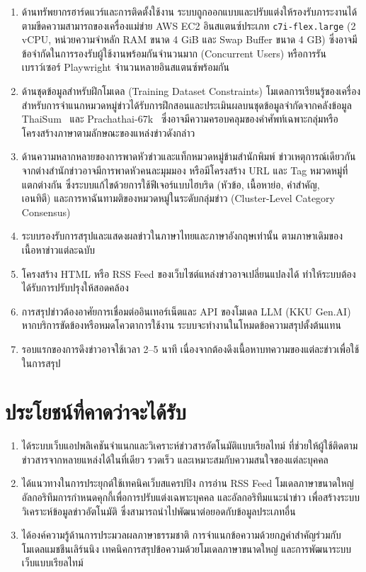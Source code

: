 \begin{enumerate}
    \item ด้านทรัพยากรฮาร์ดแวร์และการติดตั้งใช้งาน ระบบถูกออกแบบและปรับแต่งให้รองรับภาระงานได้ตามขีดความสามารถของเครื่องแม่ข่าย AWS EC2 อินสแตนซ์ประเภท \texttt{c7i-flex.large} (2 vCPU, หน่วยความจำหลัก RAM ขนาด 4 GiB และ Swap Buffer ขนาด 4 GB) ซึ่งอาจมีข้อจำกัดในการรองรับผู้ใช้งานพร้อมกันจำนวนมาก (Concurrent Users) หรือการรันเบราว์เซอร์ Playwright จำนวนหลายอินสแตนซ์พร้อมกัน
    \item ด้านชุดข้อมูลสำหรับฝึกโมเดล (Training Dataset Constraints) โมเดลการเรียนรู้ของเครื่องสำหรับการจำแนกหมวดหมู่ข่าวได้รับการฝึกสอนและประเมินผลบนชุดข้อมูลจำกัดจากคลังข้อมูล ThaiSum~\parencite{chumpolsathien2020thaisum} และ Prachathai-67k~\parencite{prachathai67k} ซึ่งอาจมีความครอบคลุมของคำศัพท์เฉพาะกลุ่มหรือโครงสร้างภาษาตามลักษณะของแหล่งข่าวดังกล่าว
    \item ด้านความหลากหลายของการพาดหัวข่าวและแท็กหมวดหมู่ข้ามสำนักพิมพ์ ข่าวเหตุการณ์เดียวกันจากต่างสำนักข่าวอาจมีการพาดหัวคนละมุมมอง หรือมีโครงสร้าง URL และ Tag หมวดหมู่ที่แตกต่างกัน ซึ่งระบบแก้ไขด้วยการใช้ฟีเจอร์แบบไฮบริด (หัวข้อ, เนื้อหาย่อ, คำสำคัญ, \\เอนทิตี) และการหาฉันทามติของหมวดหมู่ในระดับกลุ่มข่าว (Cluster-Level Category Consensus)
    \item ระบบรองรับการสรุปและแสดงผลข่าวในภาษาไทยและภาษาอังกฤษเท่านั้น ตามภาษาเดิมของเนื้อหาข่าวแต่ละฉบับ
    \item โครงสร้าง HTML หรือ RSS Feed ของเว็บไซต์แหล่งข่าวอาจเปลี่ยนแปลงได้ ทำให้ระบบต้องได้รับการปรับปรุงให้สอดคล้อง
    \item การสรุปข่าวต้องอาศัยการเชื่อมต่ออินเทอร์เน็ตและ API ของโมเดล LLM (KKU Gen.AI) หากบริการขัดข้องหรือหมดโควตาการใช้งาน ระบบจะทำงานในโหมดข้อความสรุปตั้งต้นแทน
    \item รอบแรกของการดึงข่าวอาจใช้เวลา 2--5 นาที เนื่องจากต้องดึงเนื้อหาบทความของแต่ละข่าวเพื่อใช้ในการสรุป
\end{enumerate}

\section{ประโยชน์ที่คาดว่าจะได้รับ}

\begin{enumerate}
    \item ได้ระบบเว็บแอปพลิเคชันจำแนกและวิเคราะห์ข่าวสารอัตโนมัติแบบเรียลไทม์ ที่ช่วยให้ผู้ใช้ติดตามข่าวสารจากหลายแหล่งได้ในที่เดียว รวดเร็ว และเหมาะสมกับความสนใจของแต่ละบุคคล
    \item ได้แนวทางในการประยุกต์ใช้เทคนิคเว็บสแครปปิง การอ่าน RSS Feed โมเดลภาษาขนาดใหญ่ \\อัลกอริทึมการกำหนดคุกกี้เพื่อการปรับแต่งเฉพาะบุคคล และอัลกอริทึมแนะนำข่าว เพื่อสร้างระบบวิเคราะห์ข้อมูลข่าวอัตโนมัติ ซึ่งสามารถนำไปพัฒนาต่อยอดกับข้อมูลประเภทอื่น
    \item ได้องค์ความรู้ด้านการประมวลผลภาษาธรรมชาติ การจำแนกข้อความด้วยกฎคำสำคัญร่วมกับโมเดลแมชชีนเลิร์นนิง เทคนิคการสรุปข้อความด้วยโมเดลภาษาขนาดใหญ่ และการพัฒนาระบบเว็บแบบเรียลไทม์
\end{enumerate}
